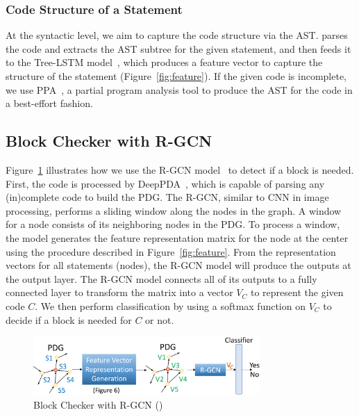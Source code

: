 \vspace{-1pt}
\subsubsection{Code Structure of a Statement}

At the syntactic level, we aim to capture the code structure via the
AST. {\tool} parses the code and extracts the AST subtree for the
given statement, and then feeds it to the Tree-LSTM
model~\cite{tai2015improved}, which produces a feature vector to
capture the structure of the statement (Figure~\ref{fig:feature}). If
the given code is incomplete, we use PPA~\cite{dagenais-oopsla08}, a
partial program analysis tool to produce the AST for the code in a
best-effort fashion.


\subsection{ Block Checker with R-GCN}
\label{model:sec}



Figure~\ref{fig:gcn} illustrates how we use the R-GCN model~\cite{rgcn} to
detect if a  block is needed.
First, the code is processed by DeepPDA~\cite{icse23}, which is
capable of parsing any (in)complete code to build the PDG. The
R-GCN, similar to CNN in image processing, performs a sliding
window along the nodes in the graph. A window for a node consists of
its neighboring nodes in the PDG.
To process a window, the model generates the feature representation
matrix for the node at the center using the procedure described in
Figure~\ref{fig:feature}.
From the representation vectors for all statements (nodes), the R-GCN
model will produce the outputs at the output layer. The R-GCN model
connects all of its outputs to a fully connected layer to transform
the matrix into a vector $V_C$ to represent the given code $C$. We
then perform classification by using a softmax function on $V_C$ to
decide if a  block is needed for $C$ or not.

\begin{figure}[t]
	\centering
	\includegraphics[width=3.4in]{xblock.png}
	\caption{ Block Checker with R-GCN ({\xblock})}
	\label{fig:gcn}	
\end{figure}

